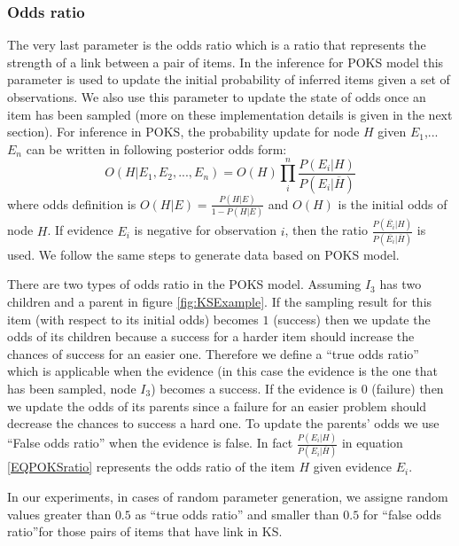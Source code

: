 \subsubsection{Odds ratio}

The very last parameter is the odds ratio which is a ratio that represents the strength of a link between a pair of items. In the inference for POKS model this parameter is used to update the initial probability of inferred items given a set of observations. We also use this parameter to update the state of odds once an item has been sampled (more on these implementation details is given in the next section).
For inference in POKS, the probability update for node $H$ given $E_1$,... $E_n$ can be written in following posterior odds form:
\begin{equation}
O(H|E_1,E_2, ... , E_n) = O(H) \prod_{i}^{n} \frac{P(E_i|H)}{P(E_i | \overline{H})}
\label{EQPOKSratio}
\end{equation}
where odds definition is $O(H|E) = \frac{P(H|E)}{1-P(H|E)}$ and $O(H)$ is the initial odds of node $H$. If evidence $E_i$ is negative for observation $i$, then the ratio $\frac{P(\overline{E_i}|H)}{P(\overline{E_i}|\overline{H})}$ is used. We follow the same steps to generate data based on POKS model. 

There are two types of odds ratio in the POKS model. Assuming $I_{3}$ has two children and a parent in figure \ref{fig:KSExample}. If the sampling result for this item (with respect to its initial odds) becomes $1$ (success) then we update the odds of its children because a success for a harder item should increase the chances of success for an easier one. Therefore we define a ``true odds ratio'' which is applicable when the evidence (in this case the evidence is the one that has been sampled,  node $I_{3}$) becomes a success. If the evidence is $0$ (failure) then we update the odds of its parents since a failure for an easier problem should decrease the chances to success a hard one. To update the parents' odds we use ``False odds ratio'' when the evidence is false. In fact $\frac{P(E_i|H)}{P(E_i | \overline{H})}$ in equation \ref{EQPOKSratio} represents the odds ratio of the item $H$ given evidence $E_i$. 

In our experiments, in cases of random parameter generation, we assigne random values greater than $0.5$ as ``true odds ratio'' and smaller than $0.5$ for ``false odds ratio''for those pairs of items that have link in KS.

